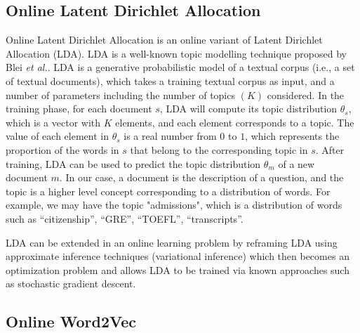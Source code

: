 \documentclass[journal,12pt,onecolumn,draftclsnofoot,]{IEEEtran}
\begin{document}


\subsection{Online Latent Dirichlet Allocation}

Online Latent Dirichlet Allocation is an online variant of Latent Dirichlet Allocation (LDA). LDA is a well-known topic modelling technique proposed by Blei \emph{et al.}\cite{lda}. LDA is a generative probabilistic model of a textual corpus (i.e., a set of textual documents), which takes a training textual corpus as input, and a number of parameters including the number of topics $(K)$ considered. In the training phase, for each document $s$, LDA will compute its topic distribution $\theta_s$, which is a vector with $K$ elements, and each element corresponds to a topic. The value of each element in $\theta_s$ is a real number from $0$ to $1$, which represents the proportion of the words in $s$ that belong to the corresponding topic in $s$. After training, LDA can be used to predict the topic distribution $\theta_m$ of a new document $m$. In our case, a document is the description of a question, and the topic is a higher level concept corresponding to a distribution of words. For example, we may have the topic "admissions", which is a distribution of words such as ``citizenship'', ``GRE'', ``TOEFL'', ``transcripts''. 

LDA can be extended in an online learning problem by reframing LDA using approximate inference techniques (variational inference) which then becomes an optimization problem and allows LDA to be trained via known approaches such as stochastic gradient descent\cite{onlinelda}. %





\subsection{Online Word2Vec}
\end{document}
